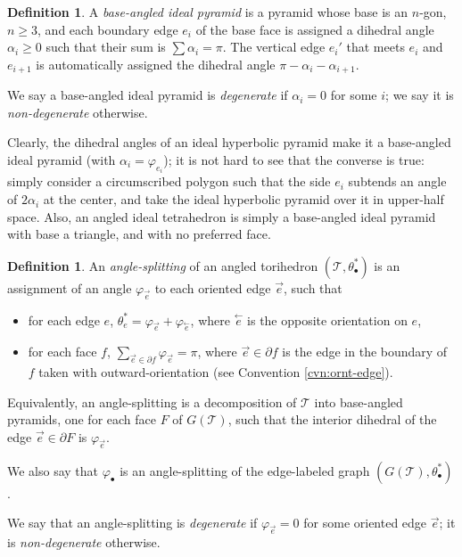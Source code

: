 \documentclass[11pt]{amsart}
\newcommand{\sT}{{\mathcal{T}}}
\newcommand{\cev}[1]{\overset{\leftarrow}{#1}}
\newcommand{\del}{\partial}
\newcommand{\vphi}{\varphi}
\theoremstyle{plain}
\theoremstyle{definition}
\newtheorem{define}[theorem]{Definition}
\newtheorem{definition}[theorem]{Definition}
\begin{document}
\begin{define}
A \emph{base-angled ideal pyramid}
is a pyramid whose base is an $n$-gon, $n \geq 3$,
and each boundary edge $e_i$ of the base face is assigned a dihedral angle
$\alpha_i \geq 0$ such that their sum is $\sum \alpha_i = \pi$.
The vertical edge $e_i'$ that meets $e_i$ and $e_{i+1}$
is automatically assigned the dihedral angle $\pi - \alpha_i - \alpha_{i+1}$.


We say a base-angled ideal pyramid is \emph{degenerate} if
$\alpha_i = 0$ for some $i$; we say it is \emph{non-degenerate} otherwise.
\end{define}


Clearly, the dihedral angles of an ideal hyperbolic pyramid
make it a base-angled ideal pyramid
(with $\alpha_i = \vphi_{e_i}$);
it is not hard to see that the converse is true:
simply consider a circumscribed polygon such that the side $e_i$
subtends an angle of $2\alpha_i$ at the center,
and take the ideal hyperbolic pyramid over it in upper-half space.
Also, an angled ideal tetrahedron is simply a base-angled ideal pyramid
with base a triangle, and with no preferred face.

\begin{definition}
An \emph{angle-splitting} of an angled torihedron $(\sT,\theta_\bullet^*)$
is an assignment of an angle $\vphi_{\vec{e}}$ to each
oriented edge $\vec{e}$, such that

\begin{itemize}
\item for each edge $e$,
$\theta_e^* = \vphi_{\vec{e}} + \vphi_{\cev{e}}$,
where $\cev{e}$ is the opposite orientation on $e$,
\item for each face $f$,
$\sum_{\vec{e} \in \del f} \vphi_{\vec{e}} = \pi$,
where $\vec{e} \in \del f$ is the edge in the boundary of $f$
taken with outward-orientation
(see Convention \ref{cvn:ornt-edge}).
\end{itemize}


Equivalently, an angle-splitting is a decomposition of
$\sT$ into base-angled pyramids,
one for each face $F$ of $G(\sT)$, such that
the interior dihedral of the edge $\vec{e} \in \del F$
is $\vphi_{\vec{e}}$.


We also say that $\vphi_\bullet$ is an angle-splitting
of the edge-labeled graph $(G(\sT), \theta_\bullet^*)$.


We say that an angle-splitting is \emph{degenerate}
if $\vphi_{\vec{e}} = 0$ for some oriented edge $\vec{e}$;
it is \emph{non-degenerate} otherwise.
\end{definition}
\end{document}
